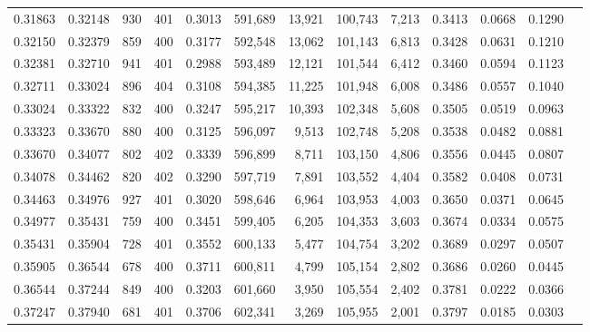 \begin{tabular}{rrrrrrrrrrrrr}
0.31863 & 0.32148 &    930 & 401 &                                     0.3013 & 591,689 &  13,921 & 100,743 &   7,213 & 0.3413 & 0.0668 & 0.1290 \\
0.32150 & 0.32379 &    859 & 400 &                                     0.3177 & 592,548 &  13,062 & 101,143 &   6,813 & 0.3428 & 0.0631 & 0.1210 \\
0.32381 & 0.32710 &    941 & 401 &                                     0.2988 & 593,489 &  12,121 & 101,544 &   6,412 & 0.3460 & 0.0594 & 0.1123 \\
0.32711 & 0.33024 &    896 & 404 &                                     0.3108 & 594,385 &  11,225 & 101,948 &   6,008 & 0.3486 & 0.0557 & 0.1040 \\
0.33024 & 0.33322 &    832 & 400 &                                     0.3247 & 595,217 &  10,393 & 102,348 &   5,608 & 0.3505 & 0.0519 & 0.0963 \\
0.33323 & 0.33670 &    880 & 400 &                                     0.3125 & 596,097 &   9,513 & 102,748 &   5,208 & 0.3538 & 0.0482 & 0.0881 \\
0.33670 & 0.34077 &    802 & 402 &                                     0.3339 & 596,899 &   8,711 & 103,150 &   4,806 & 0.3556 & 0.0445 & 0.0807 \\
0.34078 & 0.34462 &    820 & 402 &                                     0.3290 & 597,719 &   7,891 & 103,552 &   4,404 & 0.3582 & 0.0408 & 0.0731 \\
0.34463 & 0.34976 &    927 & 401 &                                     0.3020 & 598,646 &   6,964 & 103,953 &   4,003 & 0.3650 & 0.0371 & 0.0645 \\
0.34977 & 0.35431 &    759 & 400 &                                     0.3451 & 599,405 &   6,205 & 104,353 &   3,603 & 0.3674 & 0.0334 & 0.0575 \\
0.35431 & 0.35904 &    728 & 401 &                                     0.3552 & 600,133 &   5,477 & 104,754 &   3,202 & 0.3689 & 0.0297 & 0.0507 \\
0.35905 & 0.36544 &    678 & 400 &                                     0.3711 & 600,811 &   4,799 & 105,154 &   2,802 & 0.3686 & 0.0260 & 0.0445 \\
0.36544 & 0.37244 &    849 & 400 &                                     0.3203 & 601,660 &   3,950 & 105,554 &   2,402 & 0.3781 & 0.0222 & 0.0366 \\
0.37247 & 0.37940 &    681 & 401 &                                     0.3706 & 602,341 &   3,269 & 105,955 &   2,001 & 0.3797 & 0.0185 & 0.0303 \\

\end{tabular}
